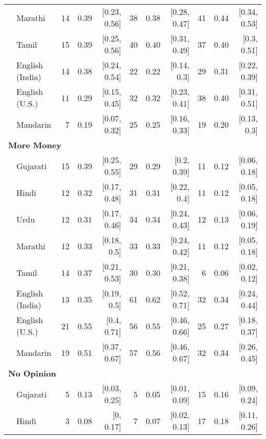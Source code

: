 \begin{table}[t]
\begin{footnotesize}
\begin{tabular}{p{.1in}lrrrrrrrrr}
 & Marathi & 14 & 0.39 & [0.23, 0.56] & 38 & 0.38 & [0.28, 0.47] & 41 & 0.44 & [0.34, 0.53]\\

 & Tamil & 15 & 0.39 & [0.25, 0.56] & 40 & 0.40 & [0.31, 0.49] & 37 & 0.40 & [0.3, 0.51]\\

 & English (India) & 14 & 0.38 & [0.24, 0.54] & 22 & 0.22 & [0.14, 0.3] & 29 & 0.31 & [0.22, 0.39]\\

 & English (U.S.) & 11 & 0.29 & [0.15, 0.45] & 32 & 0.32 & [0.23, 0.41] & 38 & 0.40 & [0.31, 0.51]\\

& Mandarin & 7 & 0.19 & [0.07, 0.32] & 25 & 0.25 & [0.16, 0.33] & 19 & 0.20 & [0.13, 0.3]\\
\midrule
\multicolumn{11}{l}{\textbf{More Money}}\\
 & Gujarati & 15 & 0.39 & [0.25, 0.55] & 29 & 0.29 & [0.2, 0.39] & 11 & 0.12 & [0.06, 0.18]\\

 & Hindi & 12 & 0.32 & [0.17, 0.48] & 31 & 0.31 & [0.22, 0.4] & 11 & 0.12 & [0.05, 0.18]\\

 & Urdu & 12 & 0.31 & [0.17, 0.46] & 34 & 0.34 & [0.24, 0.43] & 12 & 0.13 & [0.06, 0.19]\\

 & Marathi & 12 & 0.33 & [0.18, 0.5] & 33 & 0.33 & [0.24, 0.42] & 11 & 0.12 & [0.05, 0.18]\\

 & Tamil & 14 & 0.37 & [0.21, 0.53] & 30 & 0.30 & [0.21, 0.38] & 6 & 0.06 & [0.02, 0.12]\\

 & English (India) & 13 & 0.35 & [0.19, 0.5] & 61 & 0.62 & [0.52, 0.71] & 32 & 0.34 & [0.24, 0.44]\\

 & English (U.S.) & 21 & 0.55 & [0.4, 0.71] & 56 & 0.55 & [0.46, 0.66] & 25 & 0.27 & [0.18, 0.37]\\

 & Mandarin & 19 & 0.51 & [0.37, 0.67] & 57 & 0.56 & [0.46, 0.67] & 32 & 0.34 & [0.26, 0.45]\\
\midrule
\multicolumn{11}{l}{\textbf{No Opinion}}\\
 & Gujarati & 5 & 0.13 & [0.03, 0.25] & 5 & 0.05 & [0.01, 0.09] & 15 & 0.16 & [0.09, 0.24]\\

 & Hindi & 3 & 0.08 & [0, 0.17] & 7 & 0.07 & [0.02, 0.13] & 17 & 0.18 & [0.11, 0.26]\\


\end{tabular}
\end{footnotesize}
\end{table}
